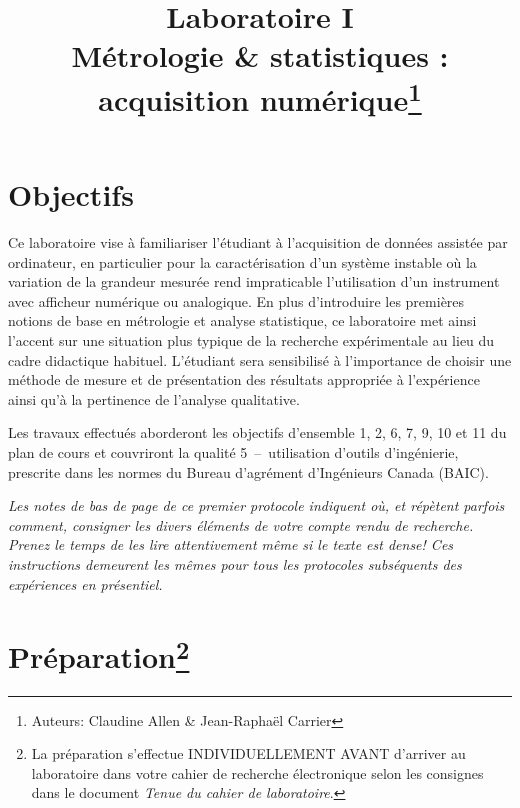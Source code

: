 \documentclass[canadien,12pt,oneside,letterpaper]{article}
\title{\textbf{Laboratoire I}\\Métrologie \& statistiques : acquisition numérique\thanks{Auteurs: Claudine Allen \& Jean-Raphaël Carrier}}
\date{}
\begin{document}
\maketitle \vspace{-2cm}

\section{Objectifs}

Ce laboratoire vise à familiariser l’étudiant à l’acquisition de données assistée par ordinateur, en particulier pour la caractérisation d’un système instable où la variation de la grandeur mesurée rend impraticable l’utilisation d’un instrument avec afficheur numérique ou analogique. En plus d’introduire les premières notions de base en métrologie et analyse statistique, ce laboratoire met ainsi l’accent sur une situation plus typique de la recherche expérimentale au lieu du cadre didactique habituel. L’étudiant sera sensibilisé à l’importance de choisir une méthode de mesure et de présentation des résultats appropriée à l’expérience ainsi qu’à la pertinence de l’analyse qualitative. 

Les travaux effectués aborderont les objectifs d’ensemble 1, 2, 6, 7, 9, 10 et 11 du plan de cours et couvriront la qualité 5~--~utilisation d’outils d’ingénierie, prescrite dans les normes du Bureau d'agrément d'Ingénieurs Canada (BAIC).

\vspace{10ex}
\noindent\textit{Les notes de bas de page de ce premier protocole indiquent où, et répètent parfois comment, consigner les divers éléments de votre compte rendu de recherche. Prenez le temps de les lire attentivement même si le texte est dense! Ces instructions demeurent les mêmes pour tous les protocoles subséquents des expériences en présentiel.}
\vspace{10ex}

\section[]{Préparation\footnote{La préparation s'effectue INDIVIDUELLEMENT AVANT d'arriver au laboratoire dans votre cahier de recherche électronique selon les consignes dans le document \textit{Tenue du cahier de laboratoire}.}}
\end{document}
